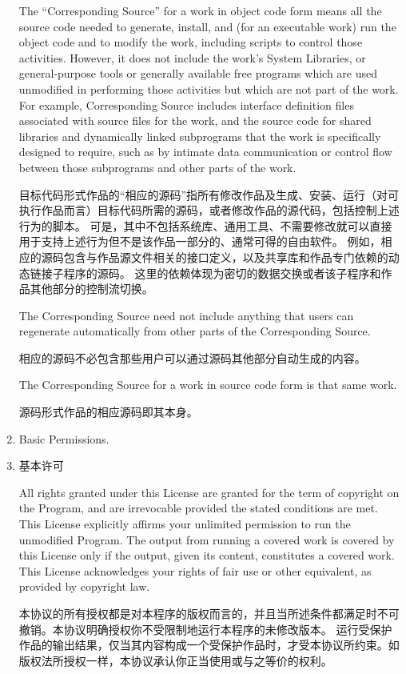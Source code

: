 \documentclass[11pt]{article}
\begin{document}
\begin{enumerate}
The ``Corresponding Source'' for a work in object code form means all
the source code needed to generate, install, and (for an executable
work) run the object code and to modify the work, including scripts to
control those activities.  However, it does not include the work's
System Libraries, or general-purpose tools or generally available free
programs which are used unmodified in performing those activities but
which are not part of the work.  For example, Corresponding Source
includes interface definition files associated with source files for
the work, and the source code for shared libraries and dynamically
linked subprograms that the work is specifically designed to require,
such as by intimate data communication or control flow between those
subprograms and other parts of the work.

目标代码形式作品的“相应的源码”指所有修改作品及生成、安装、运行（对可执行作品而言）目标代码所需的源码，或者修改作品的源代码，包括控制上述行为的脚本。
可是，其中不包括系统库、通用工具、不需要修改就可以直接用于支持上述行为但不是该作品一部分的、通常可得的自由软件。
例如，相应的源码包含与作品源文件相关的接口定义，以及共享库和作品专门依赖的动态链接子程序的源码。
这里的依赖体现为密切的数据交换或者该子程序和作品其他部分的控制流切换。

The Corresponding Source need not include anything that users
can regenerate automatically from other parts of the Corresponding
Source.

相应的源码不必包含那些用户可以通过源码其他部分自动生成的内容。


The Corresponding Source for a work in source code form is that
same work.

源码形式作品的相应源码即其本身。

\item Basic Permissions.
\item 基本许可

All rights granted under this License are granted for the term of
copyright on the Program, and are irrevocable provided the stated
conditions are met.  This License explicitly affirms your unlimited
permission to run the unmodified Program.  The output from running a
covered work is covered by this License only if the output, given its
content, constitutes a covered work.  This License acknowledges your
rights of fair use or other equivalent, as provided by copyright law.

本协议的所有授权都是对本程序的版权而言的，并且当所述条件都满足时不可撤销。本协议明确授权你不受限制地运行本程序的未修改版本。
运行受保护作品的输出结果，仅当其内容构成一个受保护作品时，才受本协议所约束。如版权法所授权一样，本协议承认你正当使用或与之等价的权利。



\end{enumerate}
\end{document}
